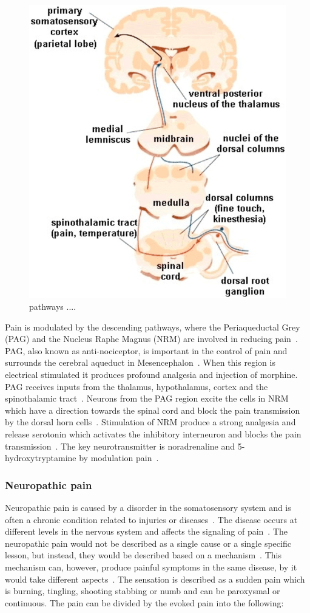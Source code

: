 \begin{figure}[H]
	\includegraphics[width=.5\textwidth]{figures/pathways.jpg} 
	\caption{pathways .... }
	\label{fig:somatosensorycortex}  
\end{figure}   

Pain is modulated by the descending pathways, where the Periaqueductal Grey (PAG) and the Nucleus Raphe Magnus (NRM) are involved in reducing pain~\cite{Steeds2013}. PAG, also known as anti-nociceptor, is important in the control of pain and surrounds the cerebral aqueduct in Mesencephalon~\cite{Steeds2013}. When this region is electrical stimulated it produces profound analgesia and injection of morphine. PAG receives inputs from the thalamus, hypothalamus, cortex and the spinothalamic tract~\cite{Steeds2013}. Neurons from the PAG region excite the cells in NRM which have a direction towards the spinal cord and block the pain transmission by the dorsal horn cells~\cite{Steeds2013}. Stimulation of NRM produce a strong analgesia and release serotonin which activates the inhibitory interneuron and blocks the pain transmission~\cite{Steeds2013}. The key neurotransmitter is noradrenaline and 5-hydroxytryptamine by modulation pain~\cite{Steeds2013}. 

\subsubsection{Neuropathic pain}
Neuropathic pain is caused by a disorder in the somatosensory system and is often a chronic condition related to injuries or diseases~\cite{Mindruta2013}. The disease occurs at different levels in the nervous system and affects the signaling of pain~\cite{Mindruta2013}. The neuropathic pain would not be described as a single cause or a single specific lesson, but instead, they would be described based on a mechanism~\cite{Mindruta2013}. This mechanism can, however, produce painful symptoms in the same disease, by it would take different aspects~\cite{Mindruta2013}.
The sensation is described as a sudden pain which is burning, tingling, shooting stabbing or numb and can be paroxysmal or continuous. The pain can be divided by the evoked pain into the following:

